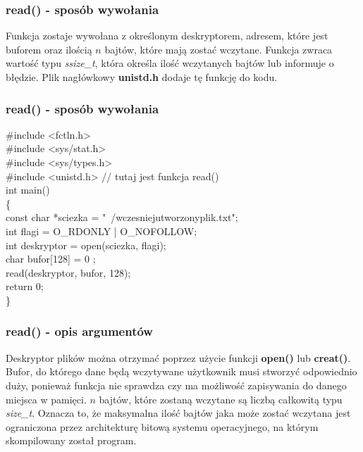 \documentclass{beamer}
\begin{document}
\begin{frame}
	\frametitle{read() - sposób wywołania}
Funkcja zostaje wywołana z określonym deskryptorem, adresem, które jest buforem oraz ilością $n$ bajtów, które mają zostać wczytane. Funkcja zwraca wartość typu \textit{ssize\_t}, która określa ilość wczytanych bajtów lub informuje o błędzie.
Plik nagłówkowy \textbf{unistd.h} dodaje tę funkcję do kodu.
\end{frame}

\begin{frame}
	\frametitle{read() - sposób wywołania}
\#include <fctln.h>\\
\#include <sys/stat.h>\\
\#include <sys/types.h>\\
\#include <unistd.h> // tutaj jest funkcja read()\\
int main()\\
\{\\
	const char *sciezka = "~/wczesniejutworzonyplik.txt";\\
	int flagi = O\_RDONLY | O\_NOFOLLOW;\\
	int deskryptor = open(sciezka, flagi);\\
	char bufor[128] = { 0 };\\
	read(deskryptor, bufor, 128);\\
	return 0;\\
\}
\end{frame}

\begin{frame}
	\frametitle{read() - opis argumentów}
Deskryptor plików można otrzymać poprzez użycie funkcji \textbf{open()} lub \textbf{creat()}.
Bufor, do którego dane będą wczytywane użytkownik musi stworzyć odpowiednio duży, ponieważ funkcja nie sprawdza czy ma możliwość zapisywania do danego miejsca w pamięci.
$n$ bajtów, które zostaną wczytane są liczbą całkowitą typu \textit{size\_t}.
Oznacza to, że maksymalna ilość bajtów jaka może zostać wczytana jest ograniczona przez architekturę bitową systemu operacyjnego, na którym skompilowany został program.
\end{frame}
\end{document}
